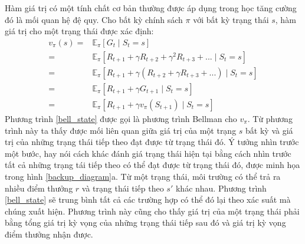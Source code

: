 Hàm giá trị có một tính chất cơ bản thường được áp dụng trong học tăng cường đó là mối quan hệ đệ quy. Cho bất kỳ chính sách $\pi$ với bất kỳ trạng thái $s$, hàm giá trị cho một trạng thái được xác định:	
\begin{align}
\label{bell_state}
v_{\pi}(s) = {}& \mathbb{E}_{\pi}\left [\mathit{G}_t \mid \mathit{S}_{t} = s\right ] \nonumber \\
= {}& \mathbb{E}_{\pi}\left [ \mathit{R}_{t+1} + \gamma \mathit{R}_{t+2} + \gamma^{2} \mathit{R}_{t+3} + ... \mid \mathit{S}_t = s  \right ] \nonumber \\
= {}& \mathbb{E}_{\pi}\left [ \mathit{R}_{t+1} + \gamma( {R}_{t+2} + \gamma \mathit{R}_{t+3} + ...) \mid \mathit{S}_t = s  \right ] \nonumber \\
= {}& \mathbb{E}_{\pi}\left [ \mathit{R}_{t+1} + \gamma\mathit{G}_{t + 1} \mid \mathit{S}_t = s  \right ] \nonumber \\
= {}& \mathbb{E}_{\pi}\left [ \mathit{R}_{t+1} + \gamma v_{\pi}(\mathit{S}_{t+1}) \mid \mathit{S}_t = s  \right ]
\end{align}	
Phương trình \ref{bell_state} được gọi là phương trình Bellman cho $v_{\pi}$. Từ phương trình này ta thấy được mối liên quan giữa giá trị của một trạng $s$ bất kỳ và giá trị của những trạng thái tiếp theo đạt được từ trạng thái đó. Ý tưởng nhìn trước một bước, hay nói cách khác đánh giá trạng thái hiện tại bằng cách nhìn trước tất cả những trạng tái tiếp theo có thể đạt được từ trạng thái đó, được minh họa trong hình \ref{backup_diagram}a. Từ một trạng thái, môi trường có thể trả ra nhiều điểm thưởng $r$ và trạng thái tiếp theo $s'$ khác nhau. Phương trình \ref{bell_state} sẽ trung bình tất cả các trường hợp có thể đó lại theo xác suất mà chúng xuất hiện. Phương trình này cũng cho thấy giá trị của một trạng thái phải bằng tổng giá trị kỳ vọng của những trạng thái tiếp sau đó và giá trị kỳ vọng điểm thưởng nhận được.
